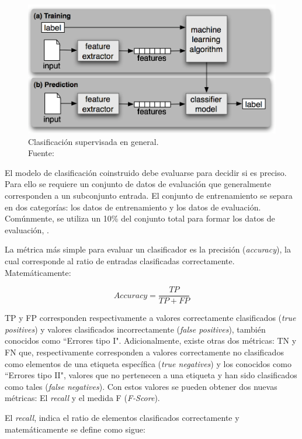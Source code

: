 \begin{figure}[H]
	\centering
	\captionsetup{justification=centering}
	\includegraphics[scale=0.8]{images/TrainingPrediction.png}
	\caption[Clasificación supervisada en general.]{Clasificación supervisada en general.\\Fuente: \cite{NPLK}}
	\label{fig:NPLK}
\end{figure}

El modelo de clasificación coinstruido debe evaluarse para decidir si es preciso. Para ello se requiere un conjunto de datos de evaluación que generalmente corresponden a un subconjunto entrada. El conjunto de entrenamiento se separa en dos categorías: los datos de entrenamiento y los datos de evaluación. Comúnmente, se utiliza un 10\% del conjunto total para formar los datos de evaluación, \cite{NPLK}.

La métrica más simple para evaluar un clasificador es la precisión (\textit{accuracy}), la cual corresponde al ratio de entradas clasificadas correctamente. Matemáticamente:

\[
	Accuracy = \frac{TP}{TP+FP}
\]

TP y FP corresponden respectivamente a valores correctamente clasificados (\textit{true positives}) y valores clasificados incorrectamente (\textit{false positives}), también conocidos como ``Errores tipo I". Adicionalmente, existe otras dos métricas: TN y FN que, respectivamente corresponden a valores correctamente no clasificados como elementos de una etiqueta específica (\textit{true negatives}) y los conocidos como ``Errores tipo II", valores que no pertenecen a una etiqueta y han sido clasificados como tales (\textit{false negatives}). Con estos valores se pueden obtener dos nuevas métricas: El \textit{recall} y el medida F (\textit{F-Score}).

El \textit{recall}, indica el ratio de elementos clasificados correctamente y matemáticamente se define como sigue:

